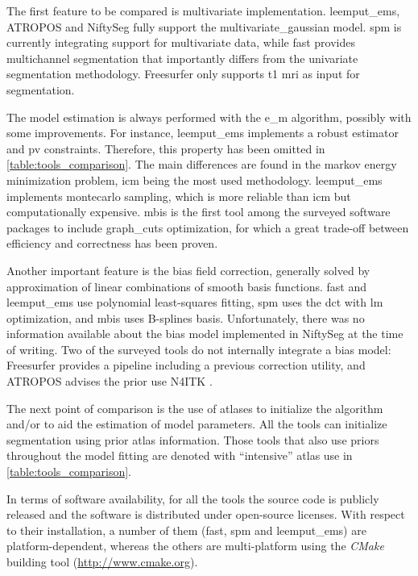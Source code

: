 The first feature to be compared is multivariate implementation.
\Gls*{leemput_ems}, ATROPOS and NiftySeg fully support the
\gls*{multivariate_gaussian} model.
\Acrshort*{spm} is currently integrating support for multivariate
  data, while \gls*{fast} provides multichannel segmentation that
  importantly differs from the univariate segmentation methodology.
Freesurfer only supports \gls*{t1} \gls*{mri} as input for segmentation.

The model estimation is always performed with the \gls*{e_m} algorithm,
  possibly with some improvements.
For instance, \gls*{leemput_ems} implements a
  robust estimator and \gls*{pv} constraints.
Therefore, this property has been omitted in \autoref{table:tools_comparison}.
The main differences are found in the \gls*{markov} energy minimization 
  problem, \gls*{icm} being the most used methodology.
\Gls*{leemput_ems} implements \acrfull*{montecarlo} sampling, which is more
  reliable than \gls*{icm} but computationally expensive.
\Gls*{mbis} is the first tool among the surveyed software packages to include
  \gls*{graph_cuts} optimization, for which a great trade-off
  between efficiency and correctness has been proven.

Another important feature is the bias field correction, generally solved by
  approximation of linear combinations of smooth basis functions.
\Gls*{fast} and \gls*{leemput_ems} use polynomial least-squares fitting,
  \gls*{spm} uses the \gls*{dct} with \gls*{lm} optimization, and \gls*{mbis}
  uses B-splines basis.
Unfortunately, there was no information available about the bias model
  implemented in NiftySeg at the time of writing.
Two of the surveyed tools do not internally integrate a bias model:
Freesurfer provides a pipeline including a previous correction utility,
  and ATROPOS advises the prior use N4ITK \citep{tustison_n4itk:_2010}.

The next point of comparison is the use of atlases to initialize the algorithm and/or
  to aid the estimation of model parameters.
All the tools can initialize segmentation using prior atlas information.
Those tools that also use priors throughout the model fitting are denoted
  with ``intensive'' atlas use in \autoref{table:tools_comparison}.

In terms of software availability, for all the tools the source
  code is publicly released and the software is distributed under 
  open-source licenses.
With respect to their installation, a number of them (\gls*{fast}, \gls*{spm} 
  and \gls*{leemput_ems}) are platform-dependent, whereas the others
  are multi-platform using the \emph{CMake} building tool (\url{http://www.cmake.org}).


